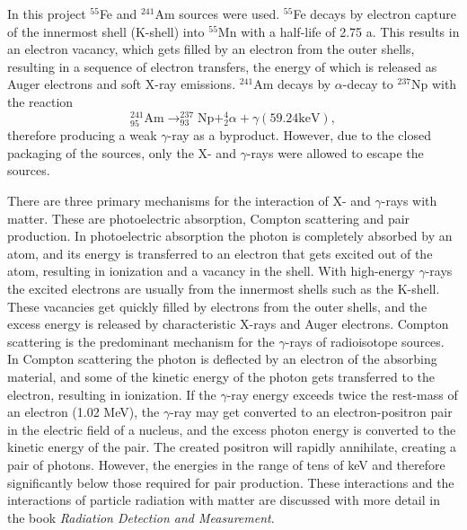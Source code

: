 \documentclass[a4paper]{article}
\begin{document}
In this project $^{55}$Fe and $^{241}$Am sources were used.
$^{55}$Fe decays by electron capture of the innermost shell (K-shell) into $^{55}$Mn with a half-life of 2.75 a.
This results in an electron vacancy, which gets filled by an electron from the outer shells, resulting in a sequence of electron transfers, the energy of which is released as Auger electrons and soft X-ray emissions.
$^{241}$Am decays by $\alpha$-decay to $^{237}$Np with the reaction
\begin{equation}
^{241}_{95}\text{Am} \rightarrow ^{237}_{93}\text{Np} + ^4_2 \alpha + \gamma (59.24 \text{keV}),
\end{equation}
therefore producing a weak $\gamma$-ray as a byproduct.
However, due to the closed packaging of the sources, only the X- and $\gamma$-rays were allowed to escape the sources.
\cite{winkler_gaseous_2015}

There are three primary mechanisms for the interaction of X- and $\gamma$-rays with matter.
These are photoelectric absorption, Compton scattering and pair production.
In photoelectric absorption the photon is completely absorbed by an atom, and its energy is transferred to an electron that gets excited out of the atom, resulting in ionization and a vacancy in the shell.
With high-energy $\gamma$-rays the excited electrons are usually from the innermost shells such as the K-shell.
These vacancies get quickly filled by electrons from the outer shells, and the excess energy is released by characteristic X-rays and Auger electrons.
Compton scattering is the predominant mechanism for the $\gamma$-rays of radioisotope sources.
In Compton scattering the photon is deflected by an electron of the absorbing material, and some of the kinetic energy of the photon gets transferred to the electron, resulting in ionization.
If the $\gamma$-ray energy exceeds twice the rest-mass of an electron (1.02 MeV), the $\gamma$-ray may get converted to an electron-positron pair in the electric field of a nucleus, and the excess photon energy is converted to the kinetic energy of the pair.
The created positron will rapidly annihilate, creating a pair of photons.
However, the energies in the range of tens of keV and therefore significantly below those required for pair production.
These interactions and the interactions of particle radiation with matter are discussed with more detail in the book \textit{Radiation Detection and Measurement}.
\cite{knoll_radiation_2010}
\end{document}
